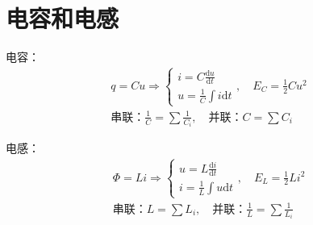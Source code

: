 \documentclass[UTF8]{report}
\theoremstyle{MyLineTheoremStyle} %
\theoremstyle{MyBlockTheoremStyle} %
\theoremstyle{MySubsubsectionStyle} %
\begin{document}
\section{电容和电感}
电容：
\begin{gather}
q = Cu
\Longrightarrow 
\begin{cases}
    i = C \frac{\mathrm{d} u }{\mathrm{d} t } \\ 
    u = \frac{1}{C} \int i \mathrm{d} t
\end{cases},\quad E_C = \frac{1}{2}Cu^2 \\ 
\text{串联：} \frac{1}{C} = \sum \frac{1}{C_i},\quad \text{并联：}C = \sum C_i
\end{gather}

电感：
\begin{gather}
    \Phi = L i
    \Longrightarrow 
    \begin{cases}
        u = L \frac{\mathrm{d} i }{\mathrm{d} t } \\ 
        i = \frac{1}{L} \int u \mathrm{d} t
    \end{cases},\quad E_L = \frac{1}{2}Li^2\\ 
    \text{串联：} L = \sum L_i,\quad \text{并联：}\frac{1}{L} = \sum \frac{1}{L_i}
\end{gather}
\end{document}
